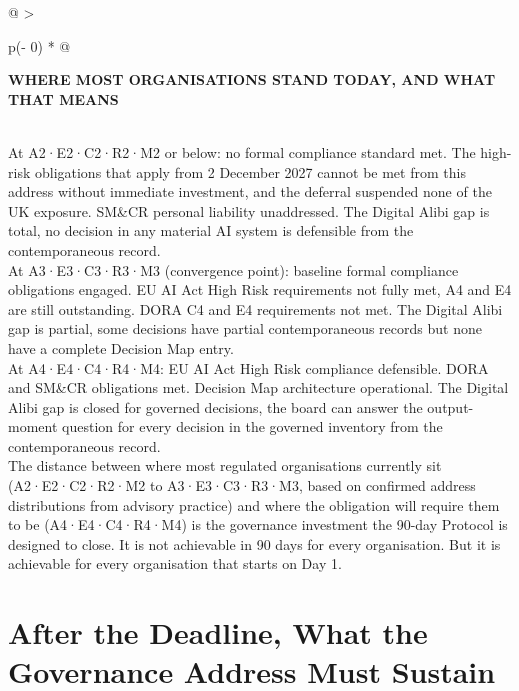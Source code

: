 \begin{longtable}[]{@{}
  >{\raggedright\arraybackslash}p{(\columnwidth - 0\tabcolsep) * }@{}}
\toprule\noalign{}
\begin{minipage}[b]{\linewidth}\raggedright
\textbf{WHERE MOST ORGANISATIONS STAND TODAY, AND WHAT THAT MEANS}
\end{minipage} \\
\midrule\noalign{}
\endhead
\bottomrule\noalign{}
\endlastfoot
At A2·E2·C2·R2·M2 or below: no formal compliance standard met. The high-risk obligations that apply from 2 December 2027 cannot be met from this address without immediate investment, and the deferral suspended none of the UK exposure. SM\&CR personal liability unaddressed. The Digital Alibi gap is total, no decision in any material AI system is defensible from the contemporaneous record. \\
At A3·E3·C3·R3·M3 (convergence point): baseline formal compliance obligations engaged. EU AI Act High Risk requirements not fully met, A4 and E4 are still outstanding. DORA C4 and E4 requirements not met. The Digital Alibi gap is partial, some decisions have partial contemporaneous records but none have a complete Decision Map entry. \\
At A4·E4·C4·R4·M4: EU AI Act High Risk compliance defensible. DORA and SM\&CR obligations met. Decision Map architecture operational. The Digital Alibi gap is closed for governed decisions, the board can answer the output-moment question for every decision in the governed inventory from the contemporaneous record. \\
The distance between where most regulated organisations currently sit (A2·E2·C2·R2·M2 to A3·E3·C3·R3·M3, based on confirmed address distributions from advisory practice) and where the obligation will require them to be (A4·E4·C4·R4·M4) is the governance investment the 90-day Protocol is designed to close. It is not achievable in 90 days for every organisation. But it is achievable for every organisation that starts on Day 1. \\
\end{longtable}

\scenebreak

\section{After the Deadline, What the Governance Address Must Sustain}

